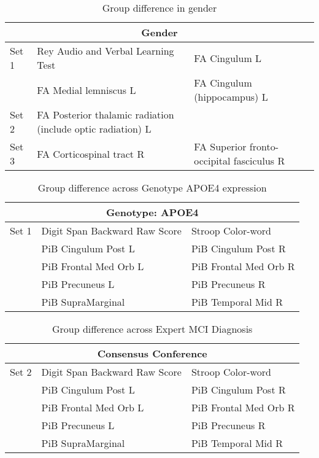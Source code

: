 \begin{table}
	\centering
	\begin{tabular}{p{0.8cm}p{5.5cm}p{6cm}}
		\toprule
		\multicolumn{3}{c}{\textbf{Gender}}\\ \midrule \midrule
        
		Set 1     & Rey Audio and Verbal Learning Test   & FA Cingulum  L	\\
		\midrule
		   & FA Medial lemniscus L	& FA Cingulum (hippocampus) L		\\
		Set 2    & FA Posterior thalamic radiation \newline (include optic radiation) L& \\ \midrule
    	Set 3    & FA Corticospinal tract R& FA Superior fronto-occipital fasciculus  R \\	\midrule\bottomrule
	\end{tabular}
    \caption{Group difference in gender}
\end{table}

\begin{table}
	\centering
	\begin{tabular}{p{0.8cm}p{5.5cm}p{6cm}}
		\toprule
		\multicolumn{3}{c}{\textbf{Genotype: APOE4}}\\ \midrule \midrule
		Set 1    &Digit Span Backward Raw Score & Stroop Color-word \\ 
		 &PiB Cingulum Post L &    PiB Cingulum Post R         \\
		&PiB Frontal Med Orb L & 		PiB Frontal Med Orb R \\ 
		&PiB Precuneus L & PiB Precuneus R \\ 
		& PiB SupraMarginal &  PiB Temporal Mid R \\ \midrule		 \bottomrule
	\end{tabular}
	\caption{Group difference across Genotype APOE4 expression}
\end{table}

\begin{table}
	\centering
	\begin{tabular}{p{0.8cm}p{5.5cm}p{6cm}}
		\toprule
		\multicolumn{3}{c}{\textbf{Consensus Conference}}\\ \midrule \midrule
		Set 2    &Digit Span Backward Raw Score & Stroop Color-word \\ 
		 &PiB Cingulum Post L &    PiB Cingulum Post R         \\
		&PiB Frontal Med Orb L & 		PiB Frontal Med Orb R \\ 
		&PiB Precuneus L & PiB Precuneus R \\ 
		& PiB SupraMarginal &  PiB Temporal Mid R \\ \midrule
		\bottomrule
	\end{tabular}
	\caption{Group difference across Expert MCI Diagnosis}
\end{table}

